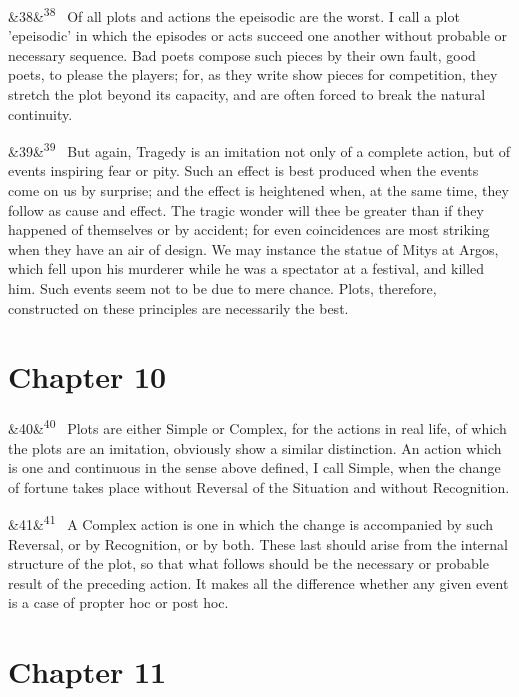 \documentclass[12pt]{article}
\newcommand{\para}[1][]{\par\noindent\ifx&#1&\else\textsuperscript{\footnotesize #1}~\fi}
\begin{document}
\para[38] Of all plots and actions the epeisodic are the worst. I call a plot 'epeisodic' in which the episodes or acts succeed one another without probable or necessary sequence. Bad poets compose such pieces by their own fault, good poets, to please the players; for, as they write show pieces for competition, they stretch the plot beyond its capacity, and are often forced to break the natural continuity.

\para[39] But again, Tragedy is an imitation not only of a complete action, but of events inspiring fear or pity. Such an effect is best produced when the events come on us by surprise; and the effect is heightened when, at the same time, they follow as cause and effect. The tragic wonder will thee be greater than if they happened of themselves or by accident; for even coincidences are most striking when they have an air of design. We may instance the statue of Mitys at Argos, which fell upon his murderer while he was a spectator at a festival, and killed him. Such events seem not to be due to mere chance. Plots, therefore, constructed on these principles are necessarily the best.

\section*{Chapter 10}

\para[40] Plots are either Simple or Complex, for the actions in real life, of which the plots are an imitation, obviously show a similar distinction. An action which is one and continuous in the sense above defined, I call Simple, when the change of fortune takes place without Reversal of the Situation and without Recognition.

\para[41] A Complex action is one in which the change is accompanied by such Reversal, or by Recognition, or by both. These last should arise from the internal structure of the plot, so that what follows should be the necessary or probable result of the preceding action. It makes all the difference whether any given event is a case of propter hoc or post hoc.

\section*{Chapter 11}
\end{document}
